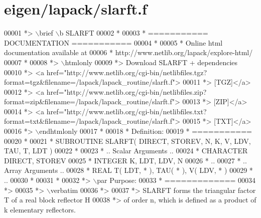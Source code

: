 \hypertarget{eigen_2lapack_2slarft_8f_source}{}\section{eigen/lapack/slarft.f}
\label{eigen_2lapack_2slarft_8f_source}

\begin{DoxyCode}
00001 \textcolor{comment}{*> \(\backslash\)brief \(\backslash\)b SLARFT}
00002 \textcolor{comment}{*}
00003 \textcolor{comment}{*  =========== DOCUMENTATION ===========}
00004 \textcolor{comment}{*}
00005 \textcolor{comment}{* Online html documentation available at }
00006 \textcolor{comment}{*            http://www.netlib.org/lapack/explore-html/ }
00007 \textcolor{comment}{*}
00008 \textcolor{comment}{*> \(\backslash\)htmlonly}
00009 \textcolor{comment}{*> Download SLARFT + dependencies }
00010 \textcolor{comment}{*> <a
       href="http://www.netlib.org/cgi-bin/netlibfiles.tgz?format=tgz&filename=/lapack/lapack\_routine/slarft.f"> }
00011 \textcolor{comment}{*> [TGZ]</a> }
00012 \textcolor{comment}{*> <a
       href="http://www.netlib.org/cgi-bin/netlibfiles.zip?format=zip&filename=/lapack/lapack\_routine/slarft.f"> }
00013 \textcolor{comment}{*> [ZIP]</a> }
00014 \textcolor{comment}{*> <a
       href="http://www.netlib.org/cgi-bin/netlibfiles.txt?format=txt&filename=/lapack/lapack\_routine/slarft.f"> }
00015 \textcolor{comment}{*> [TXT]</a>}
00016 \textcolor{comment}{*> \(\backslash\)endhtmlonly }
00017 \textcolor{comment}{*}
00018 \textcolor{comment}{*  Definition:}
00019 \textcolor{comment}{*  ===========}
00020 \textcolor{comment}{*}
00021 \textcolor{comment}{*       SUBROUTINE SLARFT( DIRECT, STOREV, N, K, V, LDV, TAU, T, LDT )}
00022 \textcolor{comment}{* }
00023 \textcolor{comment}{*       .. Scalar Arguments ..}
00024 \textcolor{comment}{*       CHARACTER          DIRECT, STOREV}
00025 \textcolor{comment}{*       INTEGER            K, LDT, LDV, N}
00026 \textcolor{comment}{*       ..}
00027 \textcolor{comment}{*       .. Array Arguments ..}
00028 \textcolor{comment}{*       REAL               T( LDT, * ), TAU( * ), V( LDV, * )}
00029 \textcolor{comment}{*       ..}
00030 \textcolor{comment}{*  }
00031 \textcolor{comment}{*}
00032 \textcolor{comment}{*> \(\backslash\)par Purpose:}
00033 \textcolor{comment}{*  =============}
00034 \textcolor{comment}{*>}
00035 \textcolor{comment}{*> \(\backslash\)verbatim}
00036 \textcolor{comment}{*>}
00037 \textcolor{comment}{*> SLARFT forms the triangular factor T of a real block reflector H}
00038 \textcolor{comment}{*> of order n, which is defined as a product of k elementary reflectors.}

\end{DoxyCode}
